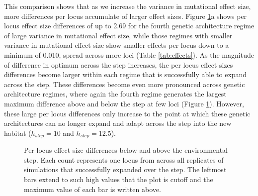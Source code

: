 This comparison shows that as we increase the variance in mutational effect size, more differences per locus accumulate of larger effect sizes. Figure \ref{fig:effectsizes}a shows per locus effect size differences of up to 2.69 %
for the fourth genetic architecture regime of large variance in mutational effect size, while those regimes with smaller variance in mutational effect size show smaller effects per locus down to a minimum of 0.010, spread across more loci (Table \ref{tab:effects}). 
As the magnitude of difference in optimum across the step increases, the per locus effect sizes differences become larger within each regime that is successfully able to expand across the step. These differences become even more pronounced across genetic architecture regimes, where again the fourth regime generates the largest maximum difference above and below the step at few loci (Figure \ref{fig:effectsizes}). However, these large per locus differences only increase to the point at which these genetic architectures can no longer expand and adapt across the step into the new habitat ($h_{step} = 10$ and $h_{step} = 12.5$).


\begin{figure}[h]
\centering
{}
\caption[Per locus effect size differences.]{Per locus effect size differences below and above the environmental step. Each count represents one locus from across all replicates of simulations that successfully expanded over the step. The leftmost bars extend to such high values that the plot is cutoff and the maximum value of each bar is written above.}
\label{fig:effectsizes}
\end{figure}


